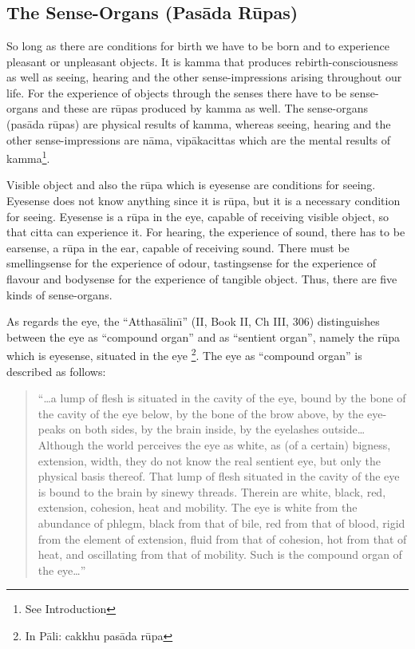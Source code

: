 \documentclass{book}
\begin{document}
\chapter[The Sense-Organs]{}
\section*{The Sense-Organs (Pas\=ada R\=upas)}




So long as there are conditions for birth we have to be born and to
experience pleasant or unpleasant objects. It is kamma that produces
rebirth-consciousness as well as seeing, hearing and the other
sense-impressions arising throughout our life. For the experience of
objects through the senses there have to be sense-organs and these
are r\=upas produced by kamma as well. The sense-organs (pas{\=a}da
r\=upas) are physical results of kamma, whereas seeing, hearing and the
other sense-impressions are n{\=a}ma, vip{\=a}kacittas which are the
mental results of kamma\footnote{See Introduction}. 

Visible object and also the r\=upa which is eyesense are conditions for
seeing. Eyesense does not know anything since it is r\=upa, but it is a
necessary condition for seeing. Eyesense is a r\=upa in the eye,
capable of receiving visible object, so that citta can experience it.
For hearing, the experience of sound, there has to be earsense, a
r\=upa in the ear, capable of receiving sound. There must be
smellingsense for the experience of odour, tastingsense for the
experience of flavour and bodysense for the experience of tangible
object. Thus, there are five kinds of sense-organs.

As regards the eye, the ``Atthas{\=a}lin\=\i'' (II, Book II, Ch III, 306)
distinguishes between the eye as ``compound organ'' and as ``sentient
organ'', namely the r\=upa which is eyesense, situated in the eye
\footnote{In P{\=a}li: cakkhu pas{\=a}da r\=upa}. The eye as
``compound organ'' is described as follows:




\begin{quote}\begin{flushleft}
``\ldots a lump of flesh is situated in the cavity of the eye, bound by the bone of the cavity of the eye below, by the bone of the brow above, by
the eye-peaks on both sides, by the brain inside, by the eyelashes
outside\ldots Although the world perceives the eye as white, as (of a
certain) bigness, extension, width, they do not know the real sentient
eye, but only the physical basis thereof. That lump of flesh situated
in the cavity of the eye is bound to the brain by sinewy threads.
Therein are white, black, red, extension, cohesion, heat and mobility.
The eye is white from the abundance of phlegm, black from that of bile,
red from that of blood, rigid from the element of extension, fluid from
that of cohesion, hot from that of heat, and oscillating from that of
mobility. Such is the compound organ of the eye\ldots''
\end{flushleft}\end{quote}
\end{document}
